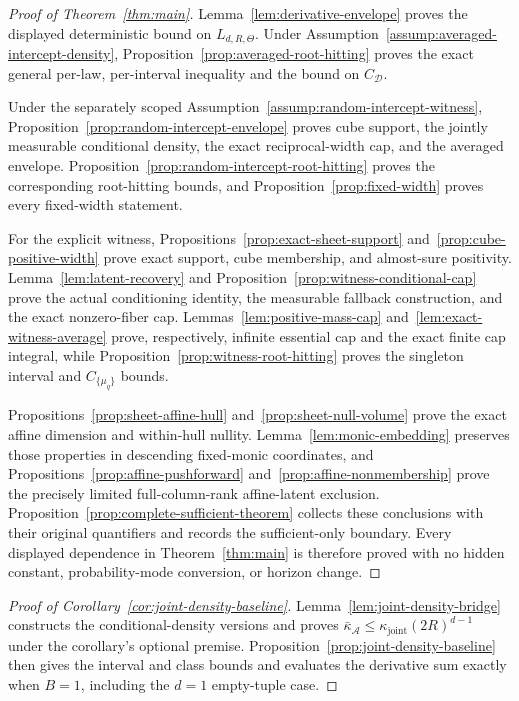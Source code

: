 \begin{proof}[Proof of Theorem~\ref{thm:main}]
Lemma~\ref{lem:derivative-envelope} proves the displayed deterministic
bound on $L_{d,R,\Theta}$.  Under
Assumption~\ref{assump:averaged-intercept-density},
Proposition~\ref{prop:averaged-root-hitting} proves the exact general
per-law, per-interval inequality and the bound on $C_{\mathcal D}$.

Under the separately scoped
Assumption~\ref{assump:random-intercept-witness},
Proposition~\ref{prop:random-intercept-envelope} proves cube support, the
jointly measurable conditional density, the exact reciprocal-width cap,
and the averaged envelope.  Proposition~\ref{prop:random-intercept-root-hitting}
proves the corresponding root-hitting bounds, and
Proposition~\ref{prop:fixed-width} proves every fixed-width statement.

For the explicit witness,
Propositions~\ref{prop:exact-sheet-support}
and~\ref{prop:cube-positive-width} prove exact support, cube membership,
and almost-sure positivity.  Lemma~\ref{lem:latent-recovery} and
Proposition~\ref{prop:witness-conditional-cap} prove the actual
conditioning identity, the measurable fallback construction, and the
exact nonzero-fiber cap.  Lemmas~\ref{lem:positive-mass-cap}
and~\ref{lem:exact-witness-average} prove, respectively, infinite
essential cap and the exact finite cap integral, while
Proposition~\ref{prop:witness-root-hitting} proves the singleton interval
and $C_{\{\mu_q\}}$ bounds.

Propositions~\ref{prop:sheet-affine-hull}
and~\ref{prop:sheet-null-volume} prove the exact affine dimension and
within-hull nullity.  Lemma~\ref{lem:monic-embedding} preserves those
properties in descending fixed-monic coordinates, and
Propositions~\ref{prop:affine-pushforward}
and~\ref{prop:affine-nonmembership} prove the precisely limited
full-column-rank affine-latent exclusion.  Proposition~\ref{prop:complete-sufficient-theorem}
collects these conclusions with their original quantifiers and records
the sufficient-only boundary.  Every displayed dependence in
Theorem~\ref{thm:main} is therefore proved with no hidden constant,
probability-mode conversion, or horizon change.
\end{proof}

\begin{proof}[Proof of Corollary~\ref{cor:joint-density-baseline}]
Lemma~\ref{lem:joint-density-bridge} constructs the conditional-density
versions and proves
$\bar\kappa_{\mathcal A}\leq
\kappa_{\mathrm{joint}}(2R)^{d-1}$ under the corollary's optional premise.
Proposition~\ref{prop:joint-density-baseline} then gives the interval and
class bounds and evaluates the derivative sum exactly when $B=1$,
including the $d=1$ empty-tuple case.
\end{proof}
